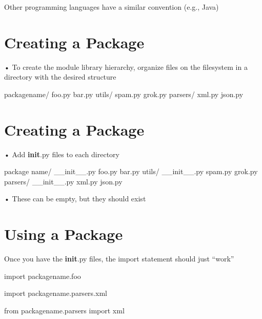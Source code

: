 \documentclass[
  letterpaper,
  DIV=11,
  numbers=noendperiod]{scrreprt}
\newenvironment{Shaded}{\begin{snugshade}}{\end{snugshade}}
\newcommand{\NormalTok}[1]{\textcolor[rgb]{0.00,0.23,0.31}{#1}}
\begin{document}
Other programming languages have a similar convention (e.g., Java)


\chapter{Creating a Package}\label{creating-a-package}

• To create the module library hierarchy, organize files on the
filesystem in a directory with the desired structure

\begin{Shaded}
\begin{Highlighting}[]
\NormalTok{packagename/ foo.py bar.py utils/ spam.py grok.py parsers/ xml.py json.py }
\end{Highlighting}
\end{Shaded}


\chapter{Creating a Package}\label{creating-a-package-1}

• Add \textbf{init}.py files to each directory

\begin{Shaded}
\begin{Highlighting}[]
\NormalTok{package name/  }
\NormalTok{\_\_init\_\_.py  }
\NormalTok{foo.py  }
\NormalTok{bar.py  }
\NormalTok{utils/  }
\NormalTok{\_\_init\_\_.py  }
\NormalTok{spam.py  }
\NormalTok{grok.py  }
\NormalTok{ parsers/  }
\NormalTok{\_\_init\_\_.py  }
\NormalTok{xml.py  }
\NormalTok{json.py}
\end{Highlighting}
\end{Shaded}

• These can be empty, but they should exist


\chapter{Using a Package}\label{using-a-package}

Once you have the \textbf{init}.py files, the import statement should
just ``work''

import packagename.foo

import packagename.parsers.xml

from packagename.parsers import xml
\end{document}
